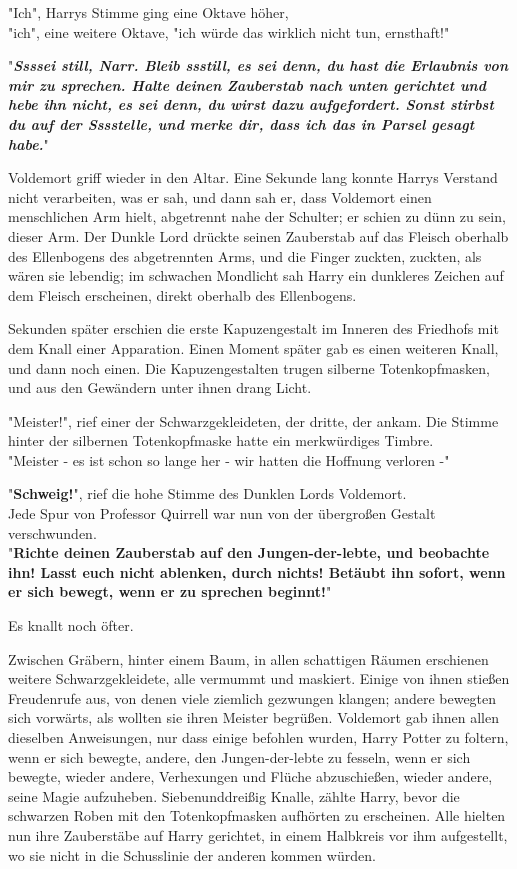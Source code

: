 {"Ich", Harrys Stimme ging eine Oktave höher,\\ "ich", eine weitere Oktave, "ich würde das wirklich nicht tun, ernsthaft!"

"\textbf{\emph{Ssssei still, Narr. Bleib ssstill, es sei denn, du hast die Erlaubnis von mir zu sprechen. Halte deinen Zauberstab nach unten gerichtet und hebe ihn nicht, es sei denn, du wirst dazu aufgefordert. Sonst stirbst du auf der Sssstelle, und merke dir, dass ich das in Parsel gesagt habe.}}"

Voldemort griff wieder in den Altar. Eine Sekunde lang konnte Harrys Verstand nicht verarbeiten, was er sah, und dann sah er, dass Voldemort einen menschlichen Arm hielt, abgetrennt nahe der Schulter; er schien zu dünn zu sein, dieser Arm. Der Dunkle Lord drückte seinen Zauberstab auf das Fleisch oberhalb des Ellenbogens des abgetrennten Arms, und die Finger zuckten, zuckten, als wären sie lebendig; im schwachen Mondlicht sah Harry ein dunkleres Zeichen auf dem Fleisch erscheinen, direkt oberhalb des Ellenbogens.

Sekunden später erschien die erste Kapuzengestalt im Inneren des Friedhofs mit dem Knall einer Apparation. Einen Moment später gab es einen weiteren Knall, und dann noch einen. Die Kapuzengestalten trugen silberne Totenkopfmasken, und aus den Gewändern unter ihnen drang Licht.

"Meister!", rief einer der Schwarzgekleideten, der dritte, der ankam. Die Stimme hinter der silbernen Totenkopfmaske hatte ein merkwürdiges Timbre.\\ "Meister - es ist schon so lange her - wir hatten die Hoffnung verloren -"

"\textbf{Schweig!}", rief die hohe Stimme des Dunklen Lords Voldemort.\\ Jede Spur von Professor Quirrell war nun von der übergroßen Gestalt verschwunden.\\ "\textbf{Richte deinen Zauberstab auf den Jungen-der-lebte, und beobachte ihn! Lasst euch nicht ablenken, durch nichts! Betäubt ihn sofort, wenn er sich bewegt, wenn er zu sprechen beginnt!}"

Es knallt noch öfter.

Zwischen Gräbern, hinter einem Baum, in allen schattigen Räumen erschienen weitere Schwarzgekleidete, alle vermummt und maskiert. Einige von ihnen stießen Freudenrufe aus, von denen viele ziemlich gezwungen klangen; andere bewegten sich vorwärts, als wollten sie ihren Meister begrüßen. Voldemort gab ihnen allen dieselben Anweisungen, nur dass einige befohlen wurden, Harry Potter zu foltern, wenn er sich bewegte, andere, den Jungen-der-lebte zu fesseln, wenn er sich bewegte, wieder andere, Verhexungen und Flüche abzuschießen, wieder andere, seine Magie aufzuheben. Siebenunddreißig Knalle, zählte Harry, bevor die schwarzen Roben mit den Totenkopfmasken aufhörten zu erscheinen. Alle hielten nun ihre Zauberstäbe auf Harry gerichtet, in einem Halbkreis vor ihm aufgestellt, wo sie nicht in die Schusslinie der anderen kommen würden.

}
